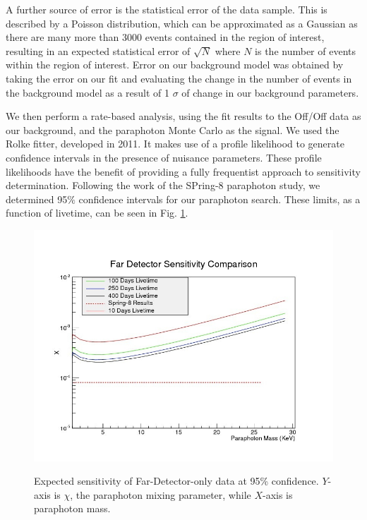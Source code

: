 A further source of error is the statistical error of the data sample. This is described by a Poisson distribution, which can be approximated as a Gaussian as there are many more than 3000 events contained in the region of interest, resulting in an expected statistical error of $ \sqrt{N} $ where $N$ is the number of events within the region of interest. Error on our background model was obtained by taking the error on our fit and evaluating the change in the number of events in the background model as a result of 1 $\sigma$ of change in our background parameters. 

We then perform a rate-based analysis, using the fit results to the Off/Off data as our background, and the paraphoton Monte Carlo as the signal. We used the Rolke  \cite{Rolke} fitter, developed in 2011. It makes use of a profile likelihood to generate confidence intervals in the presence of nuisance parameters.   These profile likelihoods have the benefit of providing a fully frequentist approach to sensitivity determination. Following the work of the SPring-8 paraphoton study, we determined 95$\%$ confidence intervals for our paraphoton search. These limits, as a function of livetime, can be seen in Fig. \ref{Sensitivity}.


 \begin{figure}
\caption{Expected sensitivity of Far-Detector-only data at 95\% confidence. $Y$-axis is $\chi$, the paraphoton mixing parameter, while $X$-axis is paraphoton mass.}
\includegraphics[width=\textwidth]{Paraphotons/FD_Sensitivity_Comparison.jpg}
\label{Sensitivity}
\end{figure}

